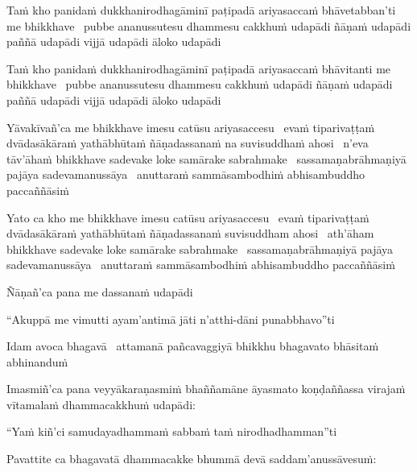 \begin{pali-hang}
  Taṁ kho panidaṁ dukkhanirodhagāminī paṭipadā ariyasaccaṁ bhāvetabban'ti me bhikkhave \breathmark\ pubbe ananussutesu dhammesu cakkhuṁ udapādi ñāṇaṁ udapādi paññā udapādi vijjā udapādi āloko udapādi
\end{pali-hang}

\begin{pali-hang}
  Taṁ kho panidaṁ dukkhanirodhagāminī paṭipadā ariyasaccaṁ bhāvitanti me bhikkhave \breathmark\ pubbe ananussutesu dhammesu cakkhuṁ udapādi ñāṇaṁ udapādi paññā udapādi vijjā udapādi āloko udapādi
\end{pali-hang}

\begin{pali-hang}
  Yāvakīvañ'ca me bhikkhave imesu catūsu ariyasaccesu \breathmark\ evaṁ tiparivaṭṭaṁ dvādasākāraṁ yathābhūtaṁ ñāṇadassanaṁ na suvisuddhaṁ ahosi \breathmark\ n'eva tāv'āhaṁ bhikkhave sadevake loke samārake sabrahmake \breathmark\ sassamaṇabrāhmaṇiyā pajāya sadevamanussāya \breathmark\ anuttaraṁ sammāsambodhiṁ abhisambuddho paccaññāsiṁ
\end{pali-hang}

\begin{pali-hang}
  Yato ca kho me bhikkhave imesu catūsu ariyasaccesu \breathmark\ evaṁ tiparivaṭṭaṁ dvādasākāraṁ yathābhūtaṁ ñāṇadassanaṁ suvisuddham ahosi \breathmark\ ath'āham bhikkhave sadevake loke samārake sabrahmake \breathmark\ sassamaṇabrāhmaṇiyā pajāya sadevamanussāya \breathmark\ anuttaraṁ sammāsambodhiṁ abhisambuddho paccaññāsiṁ
\end{pali-hang}

Ñāṇañ'ca pana me dassanaṁ udapādi

\begin{pali-hang}
  ``Akuppā me vimutti ayam'antimā jāti n'atthi-dāni punabbhavo''ti
\end{pali-hang}

\begin{pali-hang}
  Idam avoca bhagavā \breathmark\ attamanā pañcavaggiyā bhikkhu bhagavato bhāsitaṁ abhinanduṁ
\end{pali-hang}

\begin{pali-hang}
  Imasmiñ'ca pana veyyākaraṇasmiṁ bhaññamāne āyasmato koṇḍaññassa virajaṁ vītamalaṁ dhammacakkhuṁ udapādi:
\end{pali-hang}

``Yaṁ kiñ'ci samudayadhammaṁ sabbaṁ taṁ nirodhadhamman''ti

\begin{pali-hang}
  Pavattite ca bhagavatā dhammacakke bhummā devā saddam'anussāvesuṁ:
\end{pali-hang}

